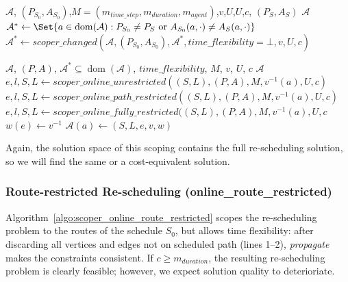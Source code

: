 \documentclass{article}
\DeclareMathOperator{\dom}{dom}
\begin{document}
\begin{algorithm}
	\caption{$scoper\_offline\_delta\_weak$} \label{algo:scoper_offline_delta_weak}
	\begin{algorithmic}[1]
		\Require $\mathcal{A}$, $(P_{S_0},A_{S_0})$,$M=(m_{time\_step},m_{duration},m_{agent})$,$v$,$U$,$U$,$c$, $(P_S,A_S)$
	    \Ensure $\mathcal{A}$
	    \State $\mathcal{A}^* \leftarrow \Set{a\in \dom(\mathcal{A}):  P_{S_0} \not=P_{S} \textrm { or } A_{S_0}(a,\cdot) \not= A_{S}(a,\cdot)}$
	    \State $\mathcal{A}^* \leftarrow scoper\_changed(\mathcal{A},(P_{S_0},A_{S_0}),\mathcal{A}^*,time\_flexibility=\bot,v,U,c)$
	\end{algorithmic}
\end{algorithm}




\begin{algorithm}
	\caption{$scoper\_changed$} \label{algo:scoper_changed}
	\begin{algorithmic}[1]
		\Require $\mathcal{A}$, $(P,A)$, $\mathcal{A}^*\subseteq\dom(\mathcal{A})$, $time\_flexibility$, $M$, $v$, $U$, $c$
	    \Ensure $\mathcal{A}$
	    \For{$a \in \dom(\mathcal{A})$}
    	        \State $e,l,S,L \leftarrow scoper\_online\_unrestricted((S,L), (P,A), M, v^{-1}(a), U, c)$
    	        \State $e,l,S,L \leftarrow scoper\_online\_path\_restricted((S,L), (P,A), M, v^{-1}(a), U, c)$
    	    \Else
    	        \State $e,l,S,L \leftarrow scoper\_online\_fully\_restricted((S,L), (P,A), M, v^{-1}(a), U, c$
    	    \EndIf
    	        \State $w(e) \leftarrow v^{-1}$
    	    \EndFor
    	    \State $\mathcal{A}(a) \leftarrow (S,L,e,v,w)$
	    \EndFor
	\end{algorithmic}
\end{algorithm}

Again, the solution space of this scoping contains the full re-scheduling solution, so we will find the same or a cost-equivalent solution.


\subsubsection{Route-restricted Re-scheduling (online\_route\_restricted)}
\label{subsubsec:scope_online_route_restricted}


Algorithm~\ref{algo:scoper_online_route_restricted} scopes the re-scheduling problem to the routes of the schedule $S_0$, but allows time flexibility: after discarding all vertices and edges not on scheduled path (lines 1--2), \emph{propagate} makes the constraints consistent. If $c\geq m_{duration}$, the resulting re-scheduling problem is clearly feasible; however, we expect solution quality to deterioriate.
\end{document}
